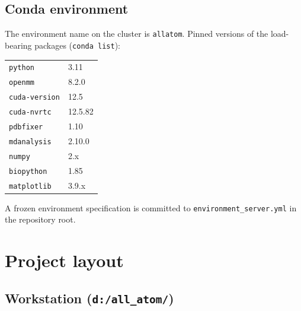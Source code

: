 \documentclass[11pt,a4paper]{article}
\begin{document}
\subsection{Conda environment}

The environment name on the cluster is \texttt{allatom}. Pinned versions
of the load-bearing packages (\texttt{conda list}):

\begin{tabular}{ll}
\toprule
\texttt{python}               & 3.11 \\
\texttt{openmm}               & 8.2.0 \\
\texttt{cuda-version}         & 12.5 \\
\texttt{cuda-nvrtc}           & 12.5.82 \\
\texttt{pdbfixer}             & 1.10 \\
\texttt{mdanalysis}           & 2.10.0 \\
\texttt{numpy}                & 2.x \\
\texttt{biopython}            & 1.85 \\
\texttt{matplotlib}           & 3.9.x \\
\bottomrule
\end{tabular}

A frozen environment specification is committed to
\texttt{environment\_server.yml} in the repository root.

\section{Project layout}
\label{sec:layout}

\subsection{Workstation (\texttt{d:/all\_atom/})}
\end{document}
